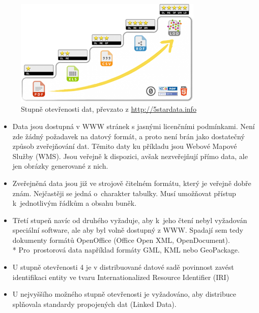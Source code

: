 \begin{figure}[hbt]%
    \centering
    \includegraphics[width=0.8\textwidth]{./pictures/5star-steps.png}
    \caption{Stupně otevřenosti dat, převzato z \url{http://5stardata.info}}
    \label{fig:Stupně otevřenosti dat}
\end{figure}

\begin{itemize}

    \item   Data jsou dostupná v WWW stránek s jasnými licenčními
            podmínkami. Není zde žádný požadavek na datový formát,
            a proto není brán jako dostatečný způsob zveřejňování dat.
            Těmito daty ku příkladu jsou Webové Mapové Služby (WMS).
            Jsou veřejně k dispozici, avšak nezveřejňují přímo data,
            ale jen obrázky generované z nich.

    \item   Zveřejněná data jsou již ve strojově čitelném formátu,
            který je veřejně dobře znám. Nejčastěji se jedná
            o~charakter tabulky. Musí umožňovat přístup k~jednotlivým
            řádkům a obsahu buněk.

    \item   Třetí stupeň navíc od druhého vyžaduje, aby k~jeho čtení
            nebyl vyžadován speciální software, ale aby byl volně
            dostupný z WWW. Spadají sem tedy dokumenty formátů
            OpenOffice (Office Open XML, OpenDocument).
        \\* Pro~prostorová data například formáty GML, KML nebo
            GeoPackage.

    \item   U stupně otevřenosti 4 je v distribuované datové sadě
            povinnost zavést identifikaci entity ve tvaru
            Internationalized Resource Identifier (IRI)

    \item   U nejvyššího možného stupně otevřenosti je vyžadováno, aby
            distribuce splňovala standardy propojených dat (Linked
            Data).

\end{itemize}


